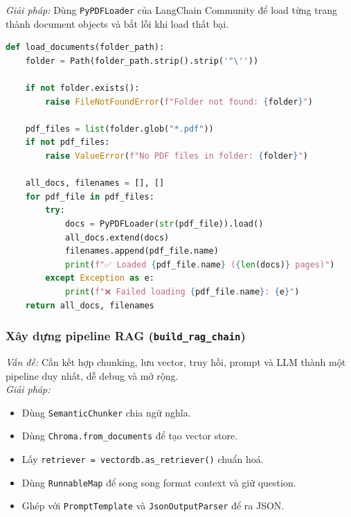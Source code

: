 \documentclass[11pt]{article}
\begin{document}
\noindent \textit{Giải pháp:} Dùng \texttt{PyPDFLoader} của LangChain Community để load từng trang thành document objects và bắt lỗi khi load thất bại.\\

\begin{lstlisting}[language=Python, caption=Đọc và load nhiều PDF]
def load_documents(folder_path):
    folder = Path(folder_path.strip().strip('"\''))

    if not folder.exists():
        raise FileNotFoundError(f"Folder not found: {folder}")

    pdf_files = list(folder.glob("*.pdf"))
    if not pdf_files:
        raise ValueError(f"No PDF files in folder: {folder}")

    all_docs, filenames = [], []
    for pdf_file in pdf_files:
        try:
            docs = PyPDFLoader(str(pdf_file)).load()
            all_docs.extend(docs)
            filenames.append(pdf_file.name)
            print(f"✅ Loaded {pdf_file.name} ({len(docs)} pages)")
        except Exception as e:
            print(f"❌ Failed loading {pdf_file.name}: {e}")
    return all_docs, filenames
\end{lstlisting}


\subsubsection*{Xây dựng pipeline RAG (\texttt{build\_rag\_chain})}

\textit{Vấn đề:} Cần kết hợp chunking, lưu vector, truy hồi, prompt và LLM thành một pipeline duy nhất, dễ debug và mở rộng.\\

\noindent \textit{Giải pháp:}
\begin{itemize}
	\item Dùng \texttt{SemanticChunker} chia ngữ nghĩa.
	\item Dùng \texttt{Chroma.from\_documents} để tạo vector store.
	\item Lấy \texttt{retriever = vectordb.as\_retriever()} chuẩn hoá.
	\item Dùng \texttt{RunnableMap} để song song format context và giữ question.
	\item Ghép với \texttt{PromptTemplate} và \texttt{JsonOutputParser} để ra JSON.
\end{itemize}
\end{document}
